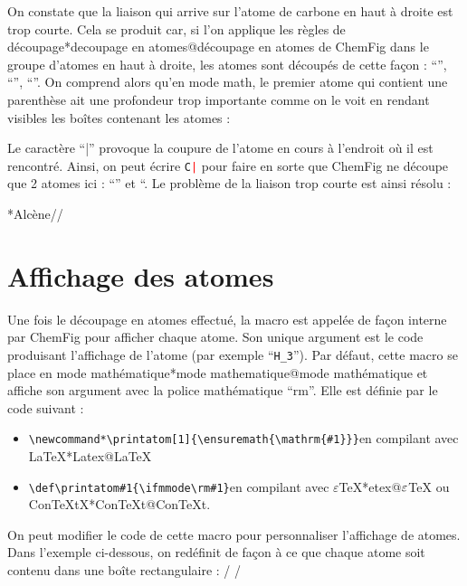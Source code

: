 \documentclass[10pt]{article}
\makeatletter
\newcommand\idx{\@ifstar{\let\print@or@not\@gobble\idx@}{\let\print@or@not\@firstofone\idx@}}
\newcommand\idx@[1]{%
	\ifcat\expandafter\noexpand\@car#1\@nil\relax%
		\expandafter\ifx\@car#1\@nil\protect
			\index{#1}%
			\print@or@not{#1}%
		\else
			\saveexpandmode\expandarg
			\StrSubstitute{\string#1}{\string @}{\@empty\protect\symbol{'100}}[\temp@]%
			\StrGobbleLeft\temp@1[\temp@]%
			\restoreexpandmode
			\expandafter\index\expandafter{\temp@ @\protect\texttt{\protect\textbackslash\temp@}}%
			\print@or@not{\texttt{\string#1}}%
		\fi
	\else
		\index{#1}%
		\print@or@not{#1}%
	\fi
}
\newcommand\make@car@active[1]{%
	\catcode`#1\active
	\begingroup
		\lccode`\~`#1\relax
		\lowercase{\endgroup\def~}%
}
\newif\if@exstar
\newcommand\exemple{%
	\begingroup
	\parskip\z@
	\@makeother\;\@makeother\!\@makeother\?\@makeother\:%
	\@ifstar{\@exstartrue\exemple@}{\@exstarfalse\exemple@}}
\newcommand\exemple@[2][65]{%
	\medbreak\noindent
	\begingroup
		\let\do\@makeother\dospecials
		\make@car@active\ { {}}%
		\make@car@active\^^M{\par\leavevmode}%
		\make@car@active\,{\leavevmode\kern\z@\string,}%
		\make@car@active\-{\leavevmode\kern\z@\string-}%
		\make@car@active\>{\leavevmode\kern\z@\string>}%
		\make@car@active\<{\leavevmode\kern\z@\string<}%
		\exemple@@{#1}{#2}%
}
\newcommand\exemple@@[3]{%
	\def\@tempa##1#3{\exemple@@@{#1}{#2}{##1}}%
	\@tempa
}
\newcommand\exemple@@@[3]{%
	\xdef\the@code{#3}%
	\endgroup
	\if@exstar
		\begingroup
			\fboxrule0.4pt
			\let\breakboxparindent\z@
			\def\bkvz@bottom{\hrule\@height\fboxrule}%
			\let\bkvz@before@breakbox\relax
			\def\bkvz@set@linewidth{\advance\linewidth\dimexpr-2\fboxrule-2\fboxsep}%
			\def\bkvz@left{\vrule\@width\fboxrule\hskip\fboxsep}%
			\def\bkvz@right{\hskip\fboxsep\vrule\@width\fboxrule}%
			\def\bkvz@top{\hbox to \hsize{%
				\vrule\@width\fboxrule\@height\fboxrule
				\leaders\bkvz@bottom\hfill
				\ECFAugie
				\fboxsep\z@
				\colorbox{black}{\kern0.25em\color{white}\footnotesize\lower0.5ex\hbox{\strut#2}\kern0.25em}%
				\leaders\bkvz@bottom\hfill
				\vrule\@width\fboxrule\@height\fboxrule}}%
			\breakbox
				\kern.5ex\relax
				\ttfamily\footnotesize\the@code\par
				\normalfont
				\kern3pt
				\hrule height0.1pt width\linewidth depth0.1pt
				\vskip5pt
				\rightskip0pt plus 1fill
				\everypar{{\color{lightgray}\rlap{\vrule height0.1pt width\linewidth depth0.1pt}}\hskip0pt plus 1fill}%
				\newlinechar`\^^M\everyeof{\noexpand}\scantokens{#3}\par
			\endbreakbox
		\endgroup
	\else
		\vskip0.5ex
		\boxput*(0,1)
			{\fboxsep\z@
			\hbox{\ECFAugie\colorbox{black}{\leavevmode\kern0.25em{\color{white}\footnotesize\strut#2}\kern0.25em}}%
			}%
			{\fboxsep5pt
			\fbox{%
				$\vcenter{\hsize\dimexpr0.#1\linewidth-\fboxsep-\fboxrule\relax
					\kern5pt\parskip0pt \ttfamily\footnotesize\the@code}%
				\vcenter{\kern5pt\hsize\dimexpr\linewidth-0.#1\linewidth-\fboxsep-\fboxrule\relax
					\everypar{{\color{lightgray}\rlap{\vrule height0.1pt width\dimexpr\linewidth-0.#1\linewidth-\fboxsep-\fboxrule depth0.1pt}}}%
					\footnotesize\newlinechar`\^^M\everyeof{\noexpand}\scantokens{#3}}$%
				}%
			}%
	\fi
	\medbreak
	\endgroup
}
\let\do\@makeother\dospecials
\newcommand\CF{{\ECFAugie ChemFig}\xspace}
\makeatother
\begin{document}
On constate que la liaison qui arrive sur l'atome de carbone en haut à droite est trop courte. Cela se produit car, si l'on applique les règles de découpage\idx*{decoupage en atomes@découpage en atomes} de \CF dans le groupe d'atomes en haut à droite, les atomes sont découpés de cette façon : ``\texttt{}'', ``\texttt{}'', ``\texttt{}''. On comprend alors qu'en mode math, le premier atome qui contient une parenthèse ait une profondeur trop importante comme on le voit en rendant visibles les boîtes contenant les atomes :
\begin{center}
\fboxsep=0pt
\renewcommand*\printatom[1]{\fbox{\ensuremath{\mathrm{#1}}}}%
%
\end{center}
Le caractère ``|'' provoque la coupure de l'atome en cours à l'endroit où il est rencontré. Ainsi, on peut écrire \texttt{C\textcolor{red}{|}} pour faire en sorte que \CF ne découpe que 2 atomes ici : ``\texttt{}'' et ``\texttt{}. Le problème de la liaison trop courte est ainsi résolu :

\exemple*{Alcène}//

\section{Affichage des atomes}\label{perso.affichage}
Une fois le découpage en atomes effectué, la macro \idx{\printatom} est appelée de façon interne par \CF pour afficher chaque atome. Son unique argument est le code produisant l'affichage de l'atome (par exemple ``\verb-H_3-''). Par défaut, cette macro se place en mode mathématique\idx*{mode mathematique@mode mathématique} et affiche son argument avec la police mathématique ``rm''. Elle est définie par le code suivant :
\begin{itemize}
	\item \verb|\newcommand*\printatom[1]{\ensuremath{\mathrm{#1}}}|\qquad en compilant avec \LaTeX{}\idx*{Latex@\protect\LaTeX}
	\item \verb|\def\printatom#1{\ifmmode\rm#1\else$\rm#1$\fi}|\qquad en compilant avec $\varepsilon$\TeX{}\idx*{etex@$\protect\varepsilon$\protect\TeX} ou Con\TeX tX\idx*{ConTeXt@Con\protect\TeX{}t}.
\end{itemize}\medskip

On peut modifier le code de cette macro pour personnaliser l'affichage de atomes. Dans l'exemple ci-dessous, on redéfinit \idx{\printatom} de façon à ce que chaque atome soit contenu dans une boîte rectangulaire :
\exemple{Redéfinition de \string\printatom}/\fboxsep=1pt
\renewcommand*\printatom[1]{\fbox{\ensuremath{\mathrm{#1}}}}
/
\end{document}
